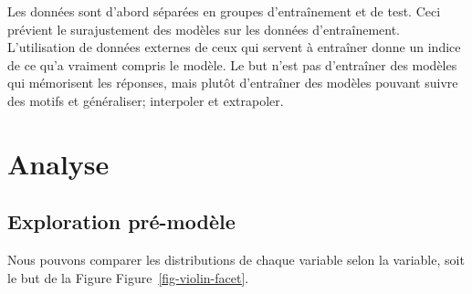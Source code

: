 \documentclass[
  oneside,
  open=any]{scrreprt}
\begin{document}
Les données sont d'abord séparées en groupes d'entraînement et de test.
Ceci prévient le surajustement des modèles sur les données
d'entraînement. L'utilisation de données externes de ceux qui servent à
entraîner donne un indice de ce qu'a vraiment compris le modèle. Le but
n'est pas d'entraîner des modèles qui mémorisent les réponses, mais
plutôt d'entraîner des modèles pouvant suivre des motifs et généraliser;
interpoler et extrapoler.

\chapter{Analyse}\label{sec-analyse}

\section{Exploration pré-modèle}\label{exploration-pruxe9-moduxe8le-1}

Nous pouvons comparer les distributions de chaque variable selon la
variable, soit le but de la Figure Figure~\ref{fig-violin-facet}.
\end{document}
